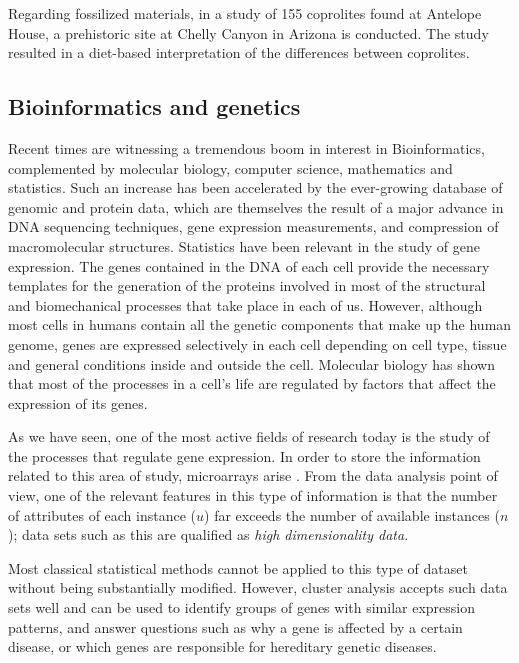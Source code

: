 Regarding fossilized materials, in \cite{sutton1995cluster} a study of 155 coprolites found at Antelope House, a prehistoric site at Chelly Canyon in Arizona is conducted. The study resulted in a diet-based interpretation of the differences between coprolites.

\subsection{Bioinformatics and genetics}

Recent times are witnessing a tremendous boom in interest in Bioinformatics, complemented by molecular biology, computer science, mathematics and statistics. Such an increase has been accelerated by the ever-growing database of genomic and protein data, which are themselves the result of a major advance in DNA sequencing techniques, gene expression measurements, and compression of macromolecular structures. Statistics have been relevant in the study of gene expression. The genes contained in the DNA of each cell provide the necessary templates for the generation of the proteins involved in most of the structural and biomechanical processes that take place in each of us. However, although most cells in humans contain all the genetic components that make up the human genome, genes are expressed selectively in each cell depending on cell type, tissue and general conditions inside and outside the cell. Molecular biology has shown that most of the processes in a cell's life are regulated by factors that affect the expression of its genes.

As we have seen, one of the most active fields of research today is the study of the processes that regulate gene expression. In order to store the information related to this area of study, microarrays arise \cite{cortese2000array}. From the data analysis point of view, one of the relevant features in this type of information is that the number of attributes of each instance ($u$) far exceeds the number of available instances ($n$); data sets such as this are qualified as \textit{high dimensionality data}.

Most classical statistical methods cannot be applied to this type of dataset without being substantially modified. However, cluster analysis accepts such data sets well and can be used to identify groups of genes with similar expression patterns, and answer questions such as why a gene is affected by a certain disease, or which genes are responsible for hereditary genetic diseases.

